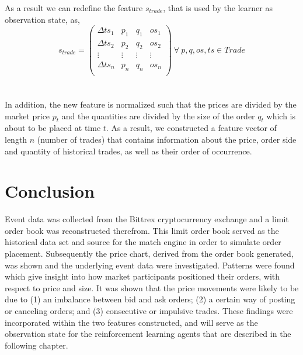 As a result we can redefine the feature $s_{trade}$, that is used by the learner as observation state, as,
\begin{equation}
    s_{trade} =\begin{pmatrix}
        \Delta{ts_1} & p_1 & q_1 & os_1 \\
        \Delta{ts_2} & p_2 & q_2 & os_2 \\
        \vdots & \vdots & \vdots & \vdots\\
        \Delta{ts_n} & p_n & q_n & os_n \\
    \end{pmatrix}
    \ \forall \ p, q, os, ts \in Trade
\end{equation}
\hfill
\\
\\
In addition, the new feature is normalized such that the prices are divided by the market price $p_t$ and the quantities are divided by the size of the order $q_t$ which is about to be placed at time $t$.
As a result, we constructed a feature vector of length $n$ (number of trades) that contains information about the price, order side and quantity of historical trades, as well as their order of occurrence.

\section{Conclusion}

Event data was collected from the Bittrex cryptocurrency exchange and a limit order book was reconstructed therefrom.
This limit order book served as the historical data set and source for the match engine in order to simulate order placement. 
Subsequently the price chart, derived from the order book generated, was shown and the underlying event data were investigated.
Patterns were found which give insight into how market participants positioned their orders, with respect to price and size.
It was shown that the price movements were likely to be due to (1) an imbalance between bid and ask orders; (2) a certain way of posting or canceling orders; and (3) consecutive or impulsive trades.
These findings were incorporated within the two features constructed, and will serve as the observation state for the reinforcement learning agents that are described in the following chapter.